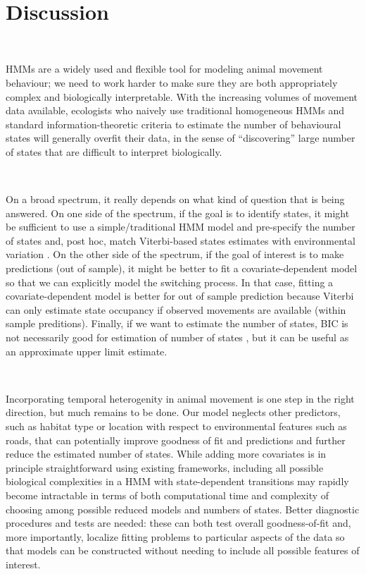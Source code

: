 \documentclass{bmcart}
\begin{document}
\

\section{Discussion}

\

HMMs are a widely used and flexible tool for modeling animal movement
behaviour; we need to work harder to make sure they are both appropriately
complex and biologically interpretable. 
With the increasing volumes of movement data available,
ecologists who naively use traditional homogeneous HMMs
and standard information-theoretic criteria
to estimate the number of behavioural states will generally
overfit their data, in the sense of ``discovering'' large
number of states that are difficult to interpret biologically.

\

On a broad spectrum, it really depends on what kind of question 
that is being answered. On one side of the spectrum, if the goal is 
to identify states, it might be sufficient to use a 
simple/traditional HMM model and pre-specify the number of states and, post hoc, 
match Viterbi-based states estimates with environmental variation 
\cite{fryxell_multiple_2008}. On the other side of the 
spectrum, if the goal of interest is to make predictions (out of sample), 
it might be better to fit a covariate-dependent model so that we can explicitly
model the switching process. In that case, fitting a covariate-dependent model is
better for out of sample prediction because Viterbi can only estimate state 
occupancy if observed movements are available (within sample preditions). 
Finally, if we want to estimate the number of states, BIC is not necessarily 
good for estimation of number of states \cite{biernacki2000assessing}, 
but it can be useful as an approximate upper limit estimate. 

\

Incorporating temporal heterogenity in animal movement is one step in
the right direction, but much remains to be done. 
Our model neglects other predictors, such as habitat type or
location with respect to environmental features such as roads,
that can potentially improve goodness of fit and predictions and 
further reduce the estimated number of states. While adding
more covariates is in principle straightforward using existing
frameworks, including all possible biological complexities in 
a HMM with state-dependent transitions may rapidly become intractable
in terms of both computational time and complexity of choosing
among possible reduced models and numbers of states.
Better diagnostic procedures and tests are needed:
these can both test overall goodness-of-fit \cite{potts_generalized_2014} 
and, more importantly, localize fitting problems to particular aspects of the
data so that models can be constructed without needing to
include all possible features of interest.
\end{document}
